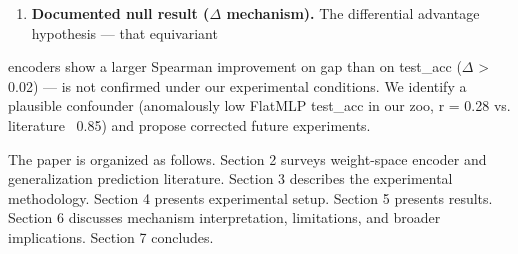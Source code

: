 \begin{enumerate}
\item \textbf{Documented null result ($\Delta$ mechanism).} The differential advantage hypothesis --- that equivariant
\end{enumerate}
   encoders show a larger Spearman improvement on gap than on test\_acc ($\Delta$ > 0.02) --- is not confirmed
   under our experimental conditions. We identify a plausible confounder (anomalously low FlatMLP test\_acc
   in our zoo, r = 0.28 vs. literature ~0.85) and propose corrected future experiments.

The paper is organized as follows. Section 2 surveys weight-space encoder and generalization prediction
literature. Section 3 describes the experimental methodology. Section 4 presents experimental setup.
Section 5 presents results. Section 6 discusses mechanism interpretation, limitations, and broader
implications. Section 7 concludes.

